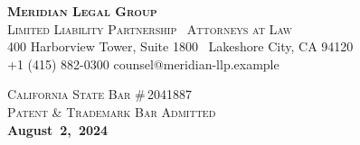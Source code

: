 

\vspace*{1.15cm}

\noindent
\begin{minipage}[t]{0.58\textwidth}
  {\color{white}\fontsize{22}{26}\selectfont\bfseries\scshape
    Meridian Legal Group}\\[3pt]
  {\color{NexaGold}\fontsize{10}{12}\selectfont\scshape
    Limited Liability Partnership \textperiodcentered\ Attorneys at Law}\\[5pt]
  {\color{white!80!NexaNavy}\footnotesize
    400 Harborview Tower, Suite 1800 \textperiodcentered\
    Lakeshore City, CA 94120\\
    \faPhone\enspace +1 (415) 882-0300 \quad
    \faEnvelope\enspace counsel@meridian-llp.example
  }
\end{minipage}%
\hfill
\begin{minipage}[t]{0.38\textwidth}\raggedleft
  {\color{white}\footnotesize\scshape
    California State Bar \#\,2041887\\
    Patent \& Trademark Bar Admitted\\[4pt]
  }
  {\color{NexaGold}\small\bfseries
    \faCalendar\enspace August~2,~2024}
\end{minipage}

\vspace{1.4cm}

